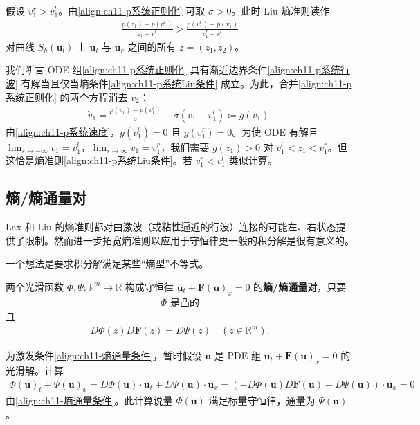 \documentclass[../../main.tex]{subfiles}
\begin{document}
\begin{example}[$p$-系统的行波。]
假设 $v_1^r>v_1^l$。由\eqref{align:ch11-p系统正则化} 可取 $\sigma>0$。此时 Liu 熵准则读作
\begin{align}
\frac{p(z_1)-p(v_1^l)}{z_1-v_1^l}>\frac{p(v_1^r)-p(v_1^l)}{v_1^r-v_1^l}
\label{align:ch11-p系统Liu条件}
\end{align}
对曲线 $S_k(\mathbf{u}_l)$ 上 $\mathbf{u}_l$ 与 $\mathbf{u}_r$ 之间的所有 $z=(z_1,z_2)$。

我们断言 ODE 组\eqref{align:ch11-p系统正则化} 具有渐近边界条件\eqref{align:ch11-p系统行波} 有解当且仅当熵条件\eqref{align:ch11-p系统Liu条件} 成立。为此，合并\eqref{align:ch11-p系统正则化} 的两个方程消去 $v_2$：
\begin{align*}
\dot{v}_1=\frac{p(v_1)-p(v_1^l)}{\sigma}-\sigma(v_1-v_1^l)\coloneqq g(v_1).
\end{align*}
由\eqref{align:ch11-p系统速度}，$g(v_1^l)=0$ 且 $g(v_1^r)=0$。为使 ODE 有解且 $\lim_{s\to-\infty}v_1=v_1^l$，$\lim_{s\to\infty}v_1=v_1^r$，我们需要 $g(z_1)>0$ 对 $v_1^l<z_1<v_1^r$。但这恰是熵准则\eqref{align:ch11-p系统Liu条件}。若 $v_1^r<v_1^l$ 类似计算。
\end{example}

\subsection{熵/熵通量对}\label{subsection:ch11-熵熵通量对}

Lax 和 Liu 的熵准则都对由激波（或粘性逼近的行波）连接的可能左、右状态提供了限制。然而进一步拓宽熵准则以应用于守恒律更一般的积分解是很有意义的。

一个想法是要求积分解满足某些``熵型''不等式。

\begin{definition}\label{definition:ch11-熵熵通量对}
两个光滑函数 $\Phi,\Psi:\mathbb{R}^m\to\mathbb{R}$ 构成守恒律 $\mathbf{u}_t+\mathbf{F}(\mathbf{u})_x=0$ 的\textbf{熵/熵通量对}，只要
\begin{align}
\Phi \text{ 是凸的}
\label{align:ch11-熵凸}
\end{align}
且
\begin{align}
D\Phi(z)D\mathbf{F}(z)=D\Psi(z) \quad (z\in\mathbb{R}^m).
\label{align:ch11-熵通量条件}
\end{align}
\end{definition}

为激发条件\eqref{align:ch11-熵通量条件}，暂时假设 $\mathbf{u}$ 是 PDE 组 $\mathbf{u}_t+\mathbf{F}(\mathbf{u})_x=0$ 的光滑解。计算
\begin{align}
\Phi(\mathbf{u})_t+\Psi(\mathbf{u})_x=D\Phi(\mathbf{u})\cdot\mathbf{u}_t+D\Psi(\mathbf{u})\cdot\mathbf{u}_x=(-D\Phi(\mathbf{u})D\mathbf{F}(\mathbf{u})+D\Psi(\mathbf{u}))\cdot\mathbf{u}_x=0
\label{align:ch11-熵守恒}
\end{align}
由\eqref{align:ch11-熵通量条件}。此计算说量 $\Phi(\mathbf{u})$ 满足标量守恒律，通量为 $\Psi(\mathbf{u})$。
\end{document}
